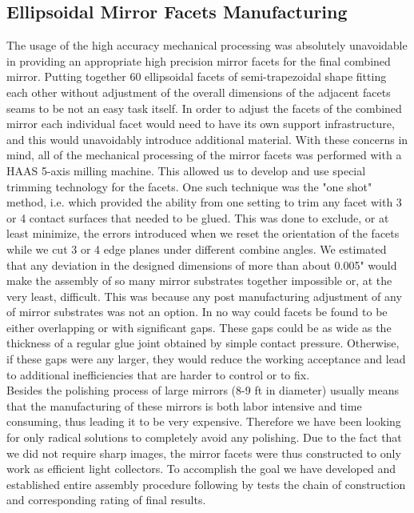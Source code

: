 \subsection {Ellipsoidal Mirror Facets Manufacturing}
\indent The usage of the high accuracy mechanical processing was absolutely unavoidable in providing an appropriate high precision mirror facets for the final combined mirror. Putting together 60 ellipsoidal facets of semi-trapezoidal shape fitting each other without adjustment of the overall dimensions of the adjacent facets seams to be not an easy task itself. In order to adjust the facets of the combined mirror each individual facet would need to have its own support infrastructure, and this would unavoidably introduce additional material. With these concerns in mind, all of the mechanical processing of the mirror facets was performed with a HAAS 5-axis milling machine. This allowed us to develop and use special trimming technology for the facets. One such technique was the "one shot" method, i.e. which provided the ability from one setting to trim any facet with 3 or 4 contact surfaces that needed to be glued. This was done to exclude, or at least minimize, the errors introduced when we reset the orientation of the facets while we cut 3 or 4 edge planes under different combine angles. We estimated that any deviation in the designed dimensions of more than about 0.005" would make the assembly of so many mirror substrates together impossible or, at the very least, difficult. This was because any post manufacturing adjustment of any of mirror substrates was not an option. In no way could facets be found to be either overlapping or with significant gaps. These gaps could be as wide as the thickness of a regular glue joint obtained by simple contact pressure. Otherwise, if these gaps were any larger, they would reduce the working acceptance and lead to additional inefficiencies that are harder to control or to fix.
\\
\indent Besides the polishing process of large mirrors (8-9 ft in diameter) usually means that the manufacturing of these mirrors is both labor intensive and time consuming, thus leading it to be very expensive. Therefore we have been looking for only radical solutions to completely avoid any polishing. Due to the fact that we did not require sharp images, the mirror facets were thus constructed to only work as efficient light collectors. To accomplish the goal we have developed and established entire assembly procedure following by tests the chain of construction and corresponding rating of final results.
